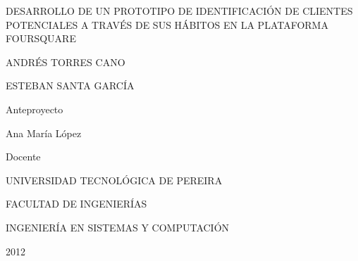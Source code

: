 \documentclass[letter,12pt,oneside,pdftex]{icontec}
\begin{document}
\thispagestyle{empty}

\begin{center}

DESARROLLO DE UN PROTOTIPO DE IDENTIFICACI\'ON DE CLIENTES POTENCIALES A TRAV\'ES DE SUS H\'ABITOS EN LA PLATAFORMA FOURSQUARE
\end{center}



\begin{center}
ANDR\'ES TORRES CANO
\end{center}
\begin{center}
ESTEBAN SANTA GARC\'IA
\end{center}
\begin{center}
Anteproyecto
\end{center}



\begin{center}
Ana Mar\'ia L\'opez
\end{center}
\begin{center}
Docente
\end{center}







\begin{center}
UNIVERSIDAD TECNOL\'OGICA DE PEREIRA
\end{center}
\begin{center}
FACULTAD DE INGENIER\'IAS
\end{center}
\begin{center}
INGENIER\'IA EN SISTEMAS Y COMPUTACI\'ON
\end{center}
\begin{center}
2012
\end{center}
\frontmatter
\tableofcontents
\mainmatter













\end{document}
